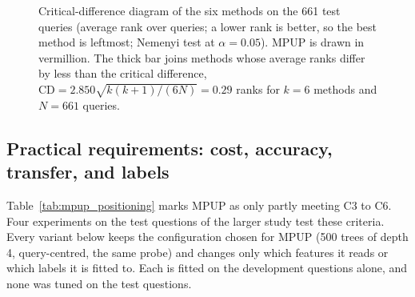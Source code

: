 \documentclass[preprint,12pt,authoryear]{elsarticle}
\begin{document}
\begin{figure}[htbp]
    \centering
    \resizebox{\columnwidth}{!}{}
    \caption{Critical-difference diagram of the six methods on the 661 test queries (average rank over queries; a lower rank is better, so the best method is leftmost; Nemenyi test at $\alpha = 0.05$). MPUP is drawn in vermillion. The thick bar joins methods whose average ranks differ by less than the critical difference, $\mathrm{CD} = 2.850\sqrt{k(k+1)/(6N)} = 0.29$ ranks for $k = 6$ methods and $N = 661$ queries.}
    \label{fig:cd}
\end{figure}

\subsection{Practical requirements: cost, accuracy, transfer, and labels}\label{sec:criteria}
Table~\ref{tab:mpup_positioning} marks MPUP as only partly meeting C3 to C6. Four experiments on the test questions of the larger study test these criteria. Every variant below keeps the configuration chosen for MPUP (500 trees of depth 4, query-centred, the same probe) and changes only which features it reads or which labels it is fitted to. Each is fitted on the development questions alone, and none was tuned on the test questions.
\end{document}
